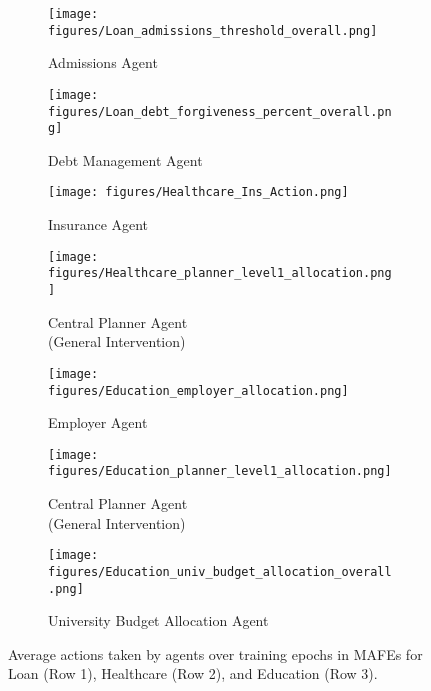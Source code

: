 \begin{figure*}[ht!]  
  \hspace{2.5cm}
  \begin{subfigure}{0.33\textwidth}
    \texttt{[image: figures/Loan\_admissions\_threshold\_overall.png]}
    \caption{Admissions Agent} \label{fig:Admissions_Threshold_Action}
  \end{subfigure}%
  \begin{subfigure}{0.33\textwidth}
    \texttt{[image: figures/Loan\_debt\_forgiveness\_percent\_overall.png]}
    \caption{Debt Management Agent} \label{fig:Debt_Forgiveness_Action}
  \end{subfigure}%

  \hspace{2.5cm}
  \begin{subfigure}{0.32\textwidth}
    \texttt{[image: figures/Healthcare\_Ins\_Action.png]}
    \caption{Insurance Agent} 
    \label{fig:Healthcare_Ins_Action}
    \vspace{0.5cm}
  \end{subfigure}%
  \hspace{0.5cm}
  \begin{subfigure}{0.33\textwidth}
    \texttt{[image: figures/Healthcare\_planner\_level1\_allocation.png]}
    \caption{Central Planner Agent \\ (General Intervention)} \label{fig:Healthcare_planner_level1_allocation}
  \end{subfigure}%
  
    \begin{subfigure}{0.31\textwidth}
    \texttt{[image: figures/Education\_employer\_allocation.png]}
    \caption{Employer Agent} \label{fig:Education_employer_allocation}
    \vspace{0.34cm}
  \end{subfigure}%
  \hspace{0.25cm}
  \begin{subfigure}{0.32\textwidth}
    \texttt{[image: figures/Education\_planner\_level1\_allocation.png]}
    \caption{Central Planner Agent \\ (General Intervention)} \label{fig:Education_planner_level1_allocation}
  \end{subfigure}%
  \hspace{0.25cm}
  \begin{subfigure}{0.31\textwidth}
    \texttt{[image: figures/Education\_univ\_budget\_allocation\_overall.png]}
    \caption{University Budget Allocation Agent} \label{fig:Education_univ_budget_allocation}
    \vspace{0.4cm}
  \end{subfigure}%

\caption{Average actions taken by agents over training epochs in MAFEs for Loan (Row 1), Healthcare (Row 2), and Education (Row 3).} \label{fig:action_summary}
\vspace{-0mm}
\end{figure*}


